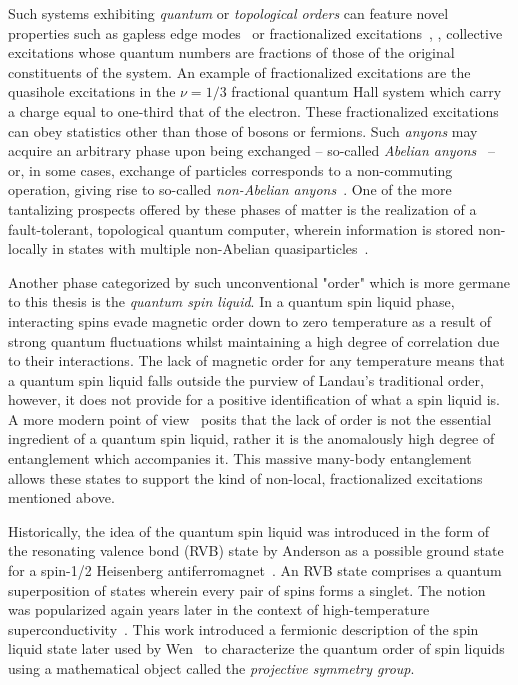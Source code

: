 Such systems exhibiting \textit{quantum} or \textit{topological orders} can feature novel properties such as gapless edge modes~\cite{HalperinPRB1982,HatsugaiPRL1993,SchulzBaldesJPA2000,KellendonkRMaP2002} or fractionalized excitations~\cite{LaughlinPRL1983,LaughlinIJM1991,dePicciottoNature1997}, \ie, collective excitations whose quantum numbers are fractions of those of the original constituents of the system.
An example of fractionalized excitations are the quasihole excitations in the $\nu = 1/3$ fractional quantum Hall system which carry a charge equal to one-third that of the electron.
These fractionalized excitations can obey statistics other than those of bosons or fermions.
Such \textit{anyons} may acquire an arbitrary phase upon being exchanged -- so-called \textit{Abelian anyons}~\cite{LeinaasNCSIF1977,WilczekPRL1982,GoldinJMP1981,WuPRL1984} -- or, in some cases, exchange of particles corresponds to a non-commuting operation, giving rise to so-called \textit{non-Abelian anyons}~\cite{MoorePLB1988,Witten1989}.
One of the more tantalizing prospects offered by these phases of matter is the realization of a fault-tolerant, topological quantum computer, wherein information is stored non-locally in states with multiple non-Abelian quasiparticles~\cite{MoessnerPRL2001,LevinRMP2005,LevinPRB2005,NayakRMP2008}.

Another phase categorized by such unconventional "order" which is more germane to this thesis is the \textit{quantum spin liquid}.
In a quantum spin liquid phase, interacting spins evade magnetic order down to zero temperature as a result of strong quantum fluctuations whilst maintaining a high degree of correlation due to their interactions.
The lack of magnetic order for any temperature means that a quantum spin liquid falls outside the purview of Landau's traditional order, however, it does not provide for a positive identification of what a spin liquid is.
A more modern point of view~\cite{SavaryRPP2016} posits that the lack of order is not the essential ingredient of a quantum spin liquid, rather it is the anomalously high degree of entanglement which accompanies it.
This massive many-body entanglement allows these states to support the kind of non-local, fractionalized excitations mentioned above.

Historically, the idea of the quantum spin liquid was introduced in the form of the resonating valence bond (RVB) state by Anderson as a possible ground state for a spin-1/2 Heisenberg antiferromagnet~\cite{AndersonMRB1973}.
An RVB state comprises a quantum superposition of states wherein every pair of spins forms a singlet.
The notion was popularized again years later in the context of high-temperature superconductivity~\cite{AndersonScience1987,BaskaranSSC1987}.
This work introduced a fermionic description of the spin liquid state later used by Wen~\cite{WenPRB2002,WenPLA2002} to characterize the quantum order of spin liquids using a mathematical object called the \textit{projective symmetry group}.


